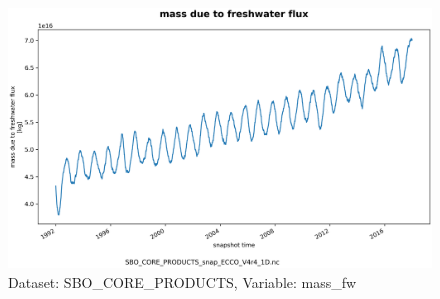 \begin{figure}[H]
\centering
\includegraphics[scale=0.55]{../images/plots/oneD_plots/SBO_Core_Products/mass_fw.png}
\caption{Dataset: SBO\_CORE\_PRODUCTS, Variable: mass\_fw}
\label{tab:table-SBO_CORE_PRODUCTS_mass_fw-Plot}
\end{figure}
\pagebreak
